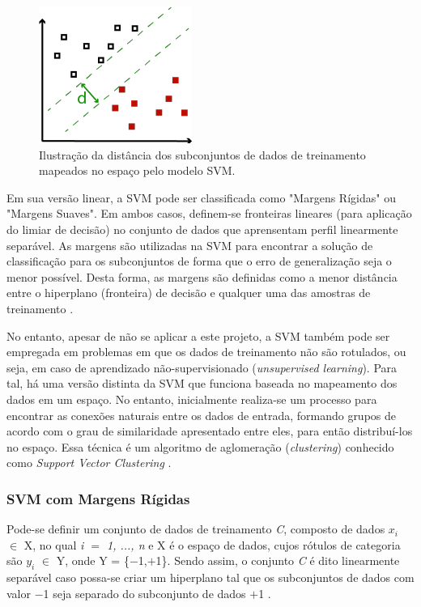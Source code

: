 \begin{figure}[H]
 \centering
  \includegraphics[width=0.4\linewidth]{figuras/svmDist.pdf}
  \caption{Ilustração da distância dos subconjuntos de dados de treinamento mapeados no espaço pelo modelo SVM.}
  \label{fig:svmDist}
\end{figure}

Em sua versão linear, a SVM pode ser classificada como "Margens Rígidas" ou "Margens Suaves". Em ambos casos, definem-se fronteiras lineares (para aplicação do limiar de decisão) no conjunto de dados que aprensentam perfil linearmente separável. As margens são utilizadas na SVM para encontrar a solução de classificação para os subconjuntos de forma que o erro de generalização seja o menor possível. Desta forma, as margens são definidas como a menor distância entre o hiperplano (fronteira) de decisão e qualquer uma das amostras de treinamento .

No entanto, apesar de não se aplicar a este projeto, a SVM também pode ser empregada em problemas em que os dados de treinamento não são rotulados, ou seja, em caso de aprendizado não-supervisionado (\textit{unsupervised learning}). Para tal, há uma versão distinta da SVM que funciona baseada no mapeamento dos dados em um espaço. No entanto, inicialmente realiza-se um processo para encontrar as conexões naturais entre os dados de entrada, formando grupos de acordo com o grau de similaridade apresentado entre eles, para então distribuí-los no espaço. Essa técnica é um algoritmo de aglomeração (\textit{clustering}) conhecido como \textit{Support Vector Clustering} .

\subsubsection{SVM com Margens Rígidas}

Pode-se definir um conjunto de dados de treinamento \textit{C}, composto de dados \textit{$x_i$} $\in$ X, no qual \textit{i $=$ 1, ..., n} e X é o espaço de dados, cujos rótulos de categoria são \textit{$y_i$} $\in$ Y, onde Y = \{$-$1,$+$1\}. Sendo assim, o conjunto \textit{C} é dito linearmente separável caso possa-se criar um hiperplano tal que os subconjuntos de dados com valor $-$1 seja separado do subconjunto de dados $+$1 .

